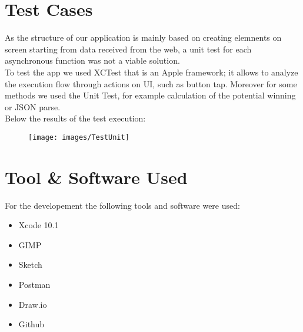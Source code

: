 \documentclass[numbers=noenddot, 12pt, a4paper, oneside]{scrbook}
\begin{document}
\chapter{Test Cases}
As the structure of our application is mainly based on creating elemnents on screen starting from data received from the web, a unit test for each asynchronous function was not a viable solution.\\

To test the app we used XCTest that is an Apple framework; it allows to analyze the execution flow through actions on UI, such as button tap. Moreover for some methods we used the Unit Test, for example calculation of the potential winning or JSON parse.\\

Below the results of the test execution:
\begin{figure}[H]
	\centering
	\texttt{[image: images/TestUnit]}
\end{figure}
\chapter{Tool \& Software Used}
For the developement the following tools and software were used:
\begin{itemize}
	\item Xcode 10.1
	\item GIMP
	\item Sketch
	\item Postman
	\item Draw.io
	\item Github
\end{itemize}
\end{document}

